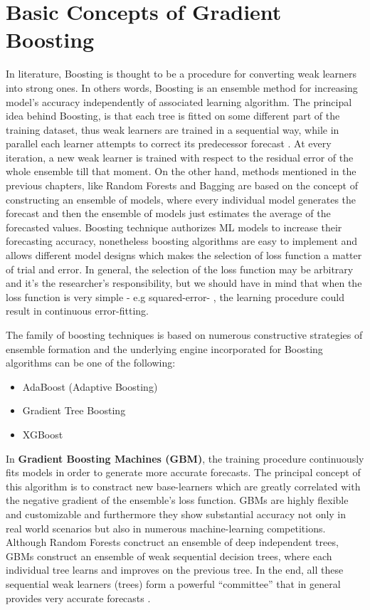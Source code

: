 \section{Basic Concepts of Gradient Boosting}
In literature, Boosting is thought to be a procedure for converting weak learners into strong ones. In
others words, Boosting is an ensemble method for increasing model's accuracy independently of associated learning algorithm. The principal idea behind Boosting, is that each tree is fitted on some different part of the training dataset, thus weak learners are trained in a sequential way, while in parallel each learner attempts to correct its predecessor forecast \cite{ligentle}. At every iteration, a new weak learner is trained with respect to the residual error of the whole ensemble till that moment. On the other hand, methods mentioned in the previous chapters, like Random Forests and Bagging are based on the concept of constructing an ensemble of models, where every individual model generates the forecast and then the ensemble of models just estimates the average of the forecasted values. Boosting technique authorizes ML models to increase their forecasting accuracy, nonetheless boosting algorithms are easy to implement and allows different model designs which makes the selection of loss function a matter of trial and error. In general, the selection of the loss function may be arbitrary and it's the researcher's responsibility, but we should have in mind that when the loss function is very simple - e.g squared-error- , the learning procedure could result in continuous error-fitting. 
\par The family of boosting techniques is based on numerous constructive strategies of ensemble formation and the underlying engine incorporated for Boosting algorithms can be one of the following:
\begin{itemize}
    \item AdaBoost (Adaptive Boosting)
    \item Gradient Tree Boosting
    \item XGBoost
\end{itemize}
In \textbf{Gradient Boosting Machines (GBM)}, the training procedure continuously fits models in order to generate more accurate forecasts. The principal concept of this algorithm is to constract new base-learners which are greatly correlated with the negative gradient of the ensemble's loss function. GBMs are highly flexible and customizable and furthermore they show substantial accuracy not only in real world scenarios but also in numerous machine-learning competitions. Although Random Forests conctruct an ensemble of deep independent trees, GBMs construct an ensemble of weak sequential decision trees, where each individual tree learns and improves on the previous tree. In the end, all these sequential weak learners (trees) form a powerful “committee” that in general provides very accurate forecasts \cite{mei2018short}.
